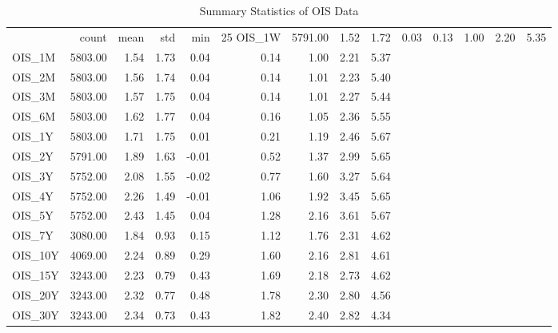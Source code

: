 \begin{table}
\caption{Summary Statistics of OIS Data}
\label{tab:summary_ois}
\begin{tabular}{lrrrrrrrr}
\toprule
 & count & mean & std & min & 25%
\midrule
OIS_1W & 5791.00 & 1.52 & 1.72 & 0.03 & 0.13 & 1.00 & 2.20 & 5.35 \\
OIS_1M & 5803.00 & 1.54 & 1.73 & 0.04 & 0.14 & 1.00 & 2.21 & 5.37 \\
OIS_2M & 5803.00 & 1.56 & 1.74 & 0.04 & 0.14 & 1.01 & 2.23 & 5.40 \\
OIS_3M & 5803.00 & 1.57 & 1.75 & 0.04 & 0.14 & 1.01 & 2.27 & 5.44 \\
OIS_6M & 5803.00 & 1.62 & 1.77 & 0.04 & 0.16 & 1.05 & 2.36 & 5.55 \\
OIS_1Y & 5803.00 & 1.71 & 1.75 & 0.01 & 0.21 & 1.19 & 2.46 & 5.67 \\
OIS_2Y & 5791.00 & 1.89 & 1.63 & -0.01 & 0.52 & 1.37 & 2.99 & 5.65 \\
OIS_3Y & 5752.00 & 2.08 & 1.55 & -0.02 & 0.77 & 1.60 & 3.27 & 5.64 \\
OIS_4Y & 5752.00 & 2.26 & 1.49 & -0.01 & 1.06 & 1.92 & 3.45 & 5.65 \\
OIS_5Y & 5752.00 & 2.43 & 1.45 & 0.04 & 1.28 & 2.16 & 3.61 & 5.67 \\
OIS_7Y & 3080.00 & 1.84 & 0.93 & 0.15 & 1.12 & 1.76 & 2.31 & 4.62 \\
OIS_10Y & 4069.00 & 2.24 & 0.89 & 0.29 & 1.60 & 2.16 & 2.81 & 4.61 \\
OIS_15Y & 3243.00 & 2.23 & 0.79 & 0.43 & 1.69 & 2.18 & 2.73 & 4.62 \\
OIS_20Y & 3243.00 & 2.32 & 0.77 & 0.48 & 1.78 & 2.30 & 2.80 & 4.56 \\
OIS_30Y & 3243.00 & 2.34 & 0.73 & 0.43 & 1.82 & 2.40 & 2.82 & 4.34 \\
\bottomrule
\end{tabular}
\end{table}
